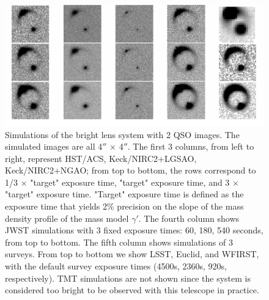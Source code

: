 \documentclass[a4paper,11pt]{article}
\begin{document}
{%
\begin{figure}
\begin{center}
\includegraphics[width=1.0\textwidth]{figures/brighter_system_2QSOimages_all.png}
\end{center}
\caption{
Simulations of the bright lens system with 2 QSO images. The simulated images are all 4$''$ $\times$ 4$''$. The first 3 columns, from left to right, represent HST/ACS, Keck/NIRC2+LGSAO, Keck/NIRC2+NGAO; from top to bottom, the rows correspond to 1/3 $\times$ "target" exposure time, "target" exposure time, and 3 $\times$ "target" exposure time. "Target" exposure time is defined as the exposure time that yields 2\% precision on the slope of the mass density profile of the mass model $\gamma'$. The fourth column shows JWST simulations with 3 fixed exposure times: 60, 180, 540 seconds, from top to bottom. The fifth column 
shows simulations of 3 surveys. From top to bottom we show LSST, Euclid, and WFIRST, with the default survey exposure times (4500s, 2360s, 920s, respectively). TMT simulations are not shown since the system is considered too bright to be observed with this telescope in practice.}
\label{fig:brighter_2QSOimages_montage}
\end{figure}


}
\end{document}
